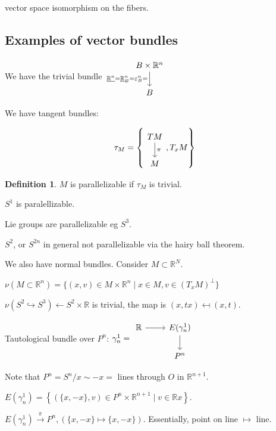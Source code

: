 \documentclass{article}
\theoremstyle{definition}
\newtheorem*{definition}{Definition}
\begin{document}
    vector space isomorphism on the fibers.

    \subsection*{Examples of vector bundles}

    We have the trivial bundle \(\begin{tikzcd} B \times \mathbb{R}^n \ar[d,"\underline{\mathbb{R}^n} = \underline{\mathbb{R}}^n_B = \varepsilon^n_B ="'] \\ B \end{tikzcd}\) 

    We have tangent bundles:

    \[
        \tau_M = \left\{ \begin{tikzcd} TM \ar[d,"\pi"] \\ M \end{tikzcd} , T_x M \right\} 
    \]

    \begin{definition}
        \(M\) is parallelizable if \(\tau_M\) is trivial.
    \end{definition}

    \(S^1\) is paralellizable.

    Lie groups are parallelizable eg \(S^3\).

    \(S^2\), or \(S^{2n}\) in general not parallelizable via the hairy ball theorem.

    We also have normal bundles. Consider \(M \subset \mathbb{R}^N\).

    \(\nu(M \subset \mathbb{R}^n) = \{ (x,v) \in M \times \mathbb{R}^n \mid x \in M, v \in (T_x M)^{\perp}\}\)
    
    \(\nu (S^2 \hookrightarrow S^3) \leftarrow S^2 \times \mathbb{R}\) is trivial, the map is \((x,tx) \mapsfrom (x,t)\).

    Tautological bundle over \(P^n\): \(\gamma_n^1 = \begin{tikzcd}
        \mathbb{R} \ar[r] & E(\gamma_n^1) \ar[d] \\ & P^n
    \end{tikzcd}\) 

    Note that \(P^n = S^n / x \sim -x =\) lines through \(O\) in \(\mathbb{R}^{n+1}\).

    \(E(\gamma_n^1) = \left\{ (\{ x,-x \}, v) \in P^n \times \mathbb{R}^{n+1} \mid v \in \mathbb{R} x \right\}\).

    \(E(\gamma_n^1) \xrightarrow{\pi} P^n, (\{ x,-x \} \mapsto \{ x,-x \})\). Essentially, point on line \(\mapsto\) line. 
\end{document}
